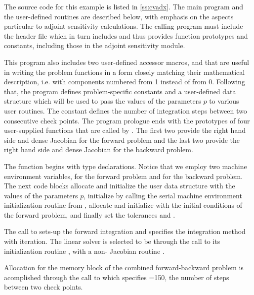 The source code for this example is listed in \A\ref{ss:cvadx}.
The main program and the user-defined routines are described below, 
with emphasis on the aspects particular to adjoint sensitivity calculations.
The calling program must include the {\cvodes} header file  which
in turn includes  and thus provides {\cvodes} function prototypes
and constants, including those in the adjoint sensitivity module.
 
This program also includes two user-defined accessor macros,
 and 
that are useful in writing the problem functions in a form closely
matching their mathematical description, i.e. with components numbered from 1 instead of from 0. 
Following that, the program defines problem-specific constants and a user-defined 
data structure which will be used to pass the values of the parameters $p$ to various
user routines. The constant  defines the number of integration steps
between two consecutive check points.
The program prologue ends with the prototypes of four user-supplied functions that are
called by {\cvodes}. The first two provide the right hand side and dense Jacobian
for the forward problem and the last two provide the right hand side and dense Jacobian 
for the backward problem.

The  function begins with type declarations. Notice that we employ two machine 
environment variables,  for the forward problem and  for
the backward problem. The next code blocks allocate and initialize the user data
structure with the values of the parameters $p$, initialize  by calling
the serial machine environment initialization routine from {\nvecs}, allocate and
initialize  with the initial conditions of the forward problem, and finally
set the tolerances  and .

The call to  sets-up the forward integration and specifies the
 integration method with  iteration. The linear solver is
selected to be {\cvdense} through the call to its initialization routine
, with a non- Jacobian routine .

Allocation for the memory block of the combined forward-backward problem is
acomplished through the call to  which specifies =150,
the number of steps between two check points.


